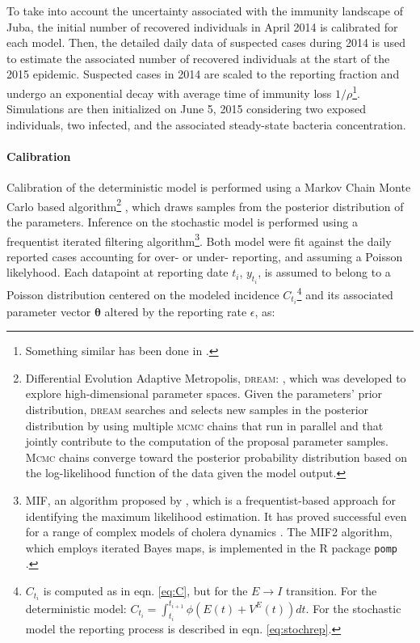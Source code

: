  
 To take into account the uncertainty associated with the immunity landscape of Juba, the initial number of recovered individuals in April 2014 is calibrated for each model. Then, the detailed daily data of suspected cases during 2014 is used to estimate the associated number of recovered individuals at the start of the 2015 epidemic. Suspected cases in 2014 are scaled to the reporting fraction and  undergo an exponential decay with average time of immunity loss $1/\rho$\footnote{Something similar has been done in \parencite{Pasetto:RealtimeProjectionsCholera:2017}.}. Simulations are then initialized on June 5, 2015 considering two exposed individuals, two infected, and the associated steady-state bacteria concentration. 
 
\paragraph{Calibration} Calibration of the deterministic model is performed using a Markov Chain Monte Carlo based algorithm\footnote{Differential Evolution Adaptive Metropolis, \textsc{dream}: \parencite{Vrugt:MarkovChainMonte:2016}, which was developed to explore high-dimensional parameter spaces. Given the parameters' prior distribution, \textsc{dream} searches and selects new samples in the posterior distribution by using multiple \textsc{mcmc} chains that run in parallel and that jointly contribute to the computation of the proposal parameter samples. \textsc{Mcmc} chains  converge toward the posterior probability distribution based on the log-likelihood function of the data given the model output.} , which draws samples from the posterior distribution of the parameters.
Inference on the stochastic model is performed using a frequentist iterated filtering algorithm\footnote{MIF, an algorithm proposed by \parencite{Ionides:InferenceDynamicLatent:2015}, which is a frequentist-based approach for identifying the maximum likelihood estimation. It has proved successful even for a range of complex models of cholera dynamics \parencite{King:InapparentInfectionsCholera:2008,Baracchini:SeasonalityCholeraDynamics:2017}. The MIF2 algorithm, which employs iterated Bayes maps, is implemented in the R package \texttt{pomp} \parencite{King:StatisticalInferencePartially:2015}. %
}. Both model were fit against the daily reported cases accounting for over- or under- reporting, and assuming a Poisson likelyhood. Each datapoint at reporting date $t_i$,  $y_{t_i}$, is assumed to belong to a Poisson distribution centered on the modeled incidence $C_{t_i}$\footnote{$C_{t_i}$ is computed as in  eqn. \eqref{eq:C}, but for the $E \rightarrow I$ transition. For the deterministic model: $ C_{t_i} = \int_{t_i}^{t_{i+1}} \phi \left(E(t) + V^E(t)\right) dt$. For the stochastic model the reporting process is described in eqn. \eqref{eq:stochrep}.
} and its associated parameter vector $\boldsymbol{\theta}$ altered by the reporting rate $\epsilon$, as:
